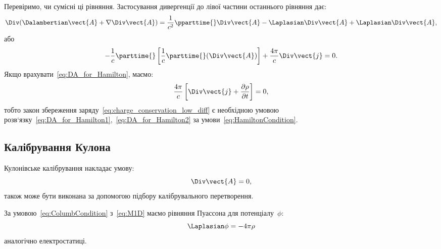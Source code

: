 Перевіримо, чи сумісні ці рівняння. Застосування дивергенції до лівої частини останнього рівняння дає:
\begin{equation*}
	\Div(\Dalambertian \vect{A}  + \nabla \Div\vect{A}) = \frac1{c^2} \pparttime{} \Div\vect{A} - \Laplasian\Div\vect{A} + \Laplasian\Div\vect{A},
\end{equation*}
або
\begin{equation}\label{eq:DA_for_Hamilton2}
	-\frac1c \parttime{} \left[ \frac1c \parttime{} (\Div\vect{A})\right] + \frac{4\pi}c \Div\vect{j} = 0.
\end{equation}
Якщо врахувати~\eqref{eq:DA_for_Hamilton}, маємо:
\begin{equation*}
	\frac{4\pi}c \left[\Div \vect{j} + \frac{\partial \rho}{\partial t}\right] = 0,
\end{equation*}
тобто закон збереження заряду~\eqref{eq:charge_conservation_low_diff} є необхідною умовою
розв`язку~\eqref{eq:DA_for_Hamilton1},~\eqref{eq:DA_for_Hamilton2} за умови~\eqref{eq:HamiltonCondition}.



\subsection*{Калібрування Кулона}

Кулонівське калібрування накладає умову:
\begin{equation}\label{eq:ColumbCondition}
	\Div \vect{A} = 0,
\end{equation}
також може бути виконана за допомогою підбору калібрувального перетворення.

За умовою~\eqref{eq:ColumbCondition} з~\eqref{eq:M1D} маємо рівняння Пуассона для потенціалу~$\phi$:
\begin{equation}\label{eq:ColumbCondition_Puasson}
	\Laplasian \phi = -4\pi \rho
\end{equation}
аналогічно електростатиці.

